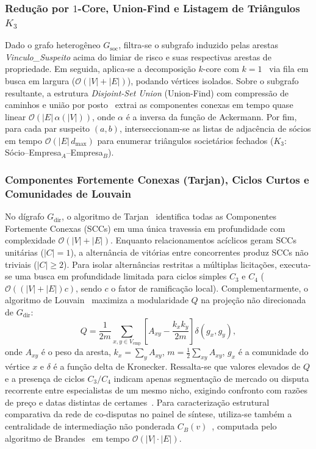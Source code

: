 \subsubsection{Redução por $1$-Core, Union-Find e Listagem de Triângulos $K_3$}
Dado o grafo heterogêneo $G_{\text{soc}}$, filtra-se o subgrafo induzido pelas arestas \textit{Vinculo\_Suspeito} acima do limiar de risco e suas respectivas arestas de propriedade. Em seguida, aplica-se a decomposição $k$-core com $k=1$~\cite{seidman1983network} via fila em busca em largura ($\mathcal{O}(|V| + |E|)$), podando vértices isolados. Sobre o subgrafo resultante, a estrutura \textit{Disjoint-Set Union} (Union-Find) com compressão de caminhos e união por posto~\cite{tarjan1975efficiency} extrai as componentes conexas em tempo quase linear $\mathcal{O}(|E|\,\alpha(|V|))$, onde $\alpha$ é a inversa da função de Ackermann. Por fim, para cada par suspeito $(a,b)$, interseccionam-se as listas de adjacência de sócios em tempo $\mathcal{O}(|E|\,d_{\max})$ para enumerar triângulos societários fechados ($K_3$: Sócio--Empresa$_A$--Empresa$_B$).

\subsubsection{Componentes Fortemente Conexas (Tarjan), Ciclos Curtos e Comunidades de Louvain}
No dígrafo $G_{\text{dir}}$, o algoritmo de Tarjan~\cite{tarjan1972depth} identifica todas as Componentes Fortemente Conexas (SCCs) em uma única travessia em profundidade com complexidade $\mathcal{O}(|V| + |E|)$. Enquanto relacionamentos acíclicos geram SCCs unitárias ($|C| = 1$), a alternância de vitórias entre concorrentes produz SCCs não triviais ($|C| \ge 2$). Para isolar alternâncias restritas a múltiplas licitações, executa-se uma busca em profundidade limitada para ciclos simples $C_3$ e $C_4$ ($\mathcal{O}((|V|+|E|)c)$, sendo $c$ o fator de ramificação local). Complementarmente, o algoritmo de Louvain~\cite{blondel2008fast} maximiza a modularidade $Q$ na projeção não direcionada de $G_{\text{dir}}$:
\begin{equation}
  Q = \frac{1}{2m} \sum_{x, y \in V_{\text{emp}}} \left[ A_{xy} - \frac{k_x k_y}{2m} \right] \delta(g_x, g_y),
\end{equation}
onde $A_{xy}$ é o peso da aresta, $k_x = \sum_y A_{xy}$, $m = \frac{1}{2}\sum_{xy} A_{xy}$, $g_x$ é a comunidade do vértice $x$ e $\delta$ é a função delta de Kronecker. Ressalta-se que valores elevados de $Q$ e a presença de ciclos $C_3/C_4$ indicam apenas segmentação de mercado ou disputa recorrente entre especialistas de um mesmo nicho, exigindo confronto com razões de preço e datas distintas de certames~\cite{imhof2018screening,aaltio2025complementary}. Para caracterização estrutural comparativa da rede de co-disputas no painel de síntese, utiliza-se também a centralidade de intermediação não ponderada $C_B(v)$~\cite{freeman1977set}, computada pelo algoritmo de Brandes~\cite{brandes2001faster} em tempo $\mathcal{O}(|V|\cdot|E|)$.

